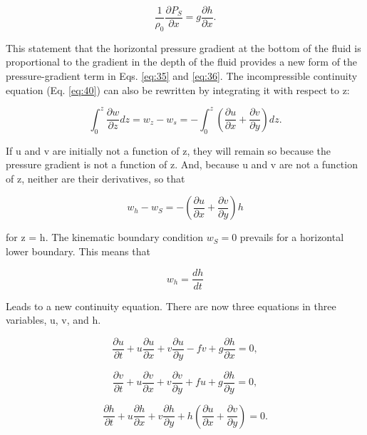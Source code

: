\documentclass{article}
\begin{document}
\begin{equation}
\frac{1}{\rho_0}\frac{\partial P_S}{\partial x} = g\frac{\partial h}{\partial x}.
\label{eq:46}
\end{equation}

This statement that the horizontal pressure gradient at the bottom of the fluid is proportional to the gradient in the depth of the fluid provides a new form of the pressure-gradient term in Eqs. \ref{eq:35} and \ref{eq:36}. The incompressible continuity equation (Eq. \ref{eq:40}) can also be rewritten by integrating it with respect to z:

\begin{equation}
\int_0^z \frac{\partial w}{\partial z}dz = w_z - w_s = -\int_0^z \left(\frac{\partial u}{\partial x} + \frac{\partial v}{\partial y}\right)dz.
\label{eq:47}
\end{equation}

If u and v are initially not a function of z, they will remain so because the pressure gradient is not a function of z. And, because u and v are not a function of z, neither are their derivatives, so that

\begin{equation}
w_h - w_S = -\left(\frac{\partial u}{\partial x} + \frac{\partial v}{\partial y}\right)h
\label{eq:48}
\end{equation}

for z = h. The kinematic boundary condition $w_S = 0$ prevails for a horizontal lower boundary.   This means that

\begin{equation}
w_h = \frac{dh}{dt}
\label{eq:49}
\end{equation}

Leads to a new continuity equation. There are now three equations in three variables, u, v, and h.

\begin{equation}
\frac{\partial u}{\partial t} + u\frac{\partial u}{\partial x} + v\frac{\partial u}{\partial y} - fv + g\frac{\partial h}{\partial x} = 0,
\label{eq:50}
\end{equation}

\begin{equation}
\frac{\partial v}{\partial t} + u\frac{\partial v}{\partial x} + v\frac{\partial v}{\partial y} + fu + g\frac{\partial h}{\partial y} = 0,
\label{eq:51}
\end{equation}

\begin{equation}
\frac{\partial h}{\partial t} + u\frac{\partial h}{\partial x} + v\frac{\partial h}{\partial y} + h\left(\frac{\partial u}{\partial x} + \frac{\partial v}{\partial y}\right) = 0.
\label{eq:52}
\end{equation}
\end{document}
